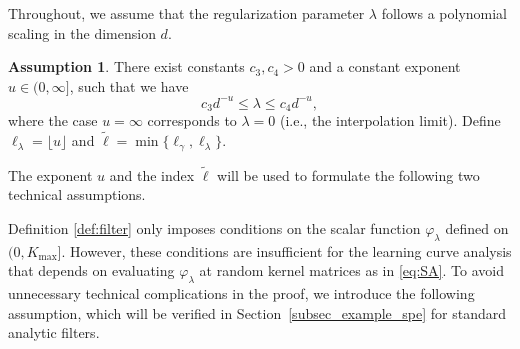 \documentclass{article}
\theoremstyle{plain}
\theoremstyle{definition}
\newtheorem{assumption}{Assumption} %
\theoremstyle{remark}
\newcommand{\calH}{\mathcal{H}}
\newcommand{\reg}{\varphi_\lambda}
\newcommand{\R}{\mathbb{R}}
\providecommand{\ang}[1]{\left\langle{#1}\right\rangle}
\begin{document}

    

Throughout, we assume that the regularization parameter $\lambda$ follows a polynomial scaling in the dimension $d$. 
\begin{assumption}\label{assume_lambda}
    There exist constants $c_3,c_4>0$ and a constant exponent $u \in (0, \infty]$, such that we have
    $$
    c_3 d^{-u} \leq \lambda \leq c_4 d^{-u},
    $$
    where the case $u = \infty$ corresponds to $\lambda=0$ (i.e., the interpolation limit). Define  $\ell_{\lambda} = \lfloor u \rfloor$ and $\tilde{\ell}=\min\{\ell_{\gamma}, \ell_{\lambda}\}$.
\end{assumption}

The exponent $u$ and the index $\tilde{\ell}$ will be used to formulate the following two technical assumptions. 



Definition \ref{def:filter} only imposes conditions on the scalar function $\reg$ defined on $(0, K_{\max}]$. 
However, these conditions are insufficient for the learning curve analysis that depends on evaluating $\reg$ at random kernel matrices as in \eqref{eq:SA}. 
To avoid unnecessary technical complications in the proof, we introduce the following assumption, which will be verified in Section~\ref{subsec_example_spe} for standard analytic filters.


\end{document}

